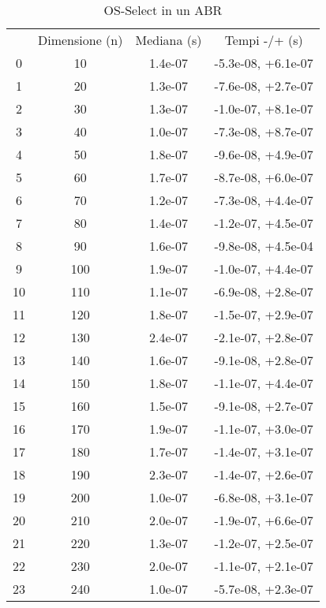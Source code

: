 \begin{table}
\centering
\caption{OS-Select in un ABR}
\label{OS-Select in un ABR}
\begin{adjustbox}{width=1\textwidth/2}
\begin{tabular}{|c|c|c|c|}
\hline
 & Dimensione (n) & Mediana (s) & Tempi -/+ (s) \\
0 & 10 & 1.4e-07 & -5.3e-08, +6.1e-07 \\
\cline{1-4}
1 & 20 & 1.3e-07 & -7.6e-08, +2.7e-07 \\
\cline{1-4}
2 & 30 & 1.3e-07 & -1.0e-07, +8.1e-07 \\
\cline{1-4}
3 & 40 & 1.0e-07 & -7.3e-08, +8.7e-07 \\
\cline{1-4}
4 & 50 & 1.8e-07 & -9.6e-08, +4.9e-07 \\
\cline{1-4}
5 & 60 & 1.7e-07 & -8.7e-08, +6.0e-07 \\
\cline{1-4}
6 & 70 & 1.2e-07 & -7.3e-08, +4.4e-07 \\
\cline{1-4}
7 & 80 & 1.4e-07 & -1.2e-07, +4.5e-07 \\
\cline{1-4}
8 & 90 & 1.6e-07 & -9.8e-08, +4.5e-04 \\
\cline{1-4}
9 & 100 & 1.9e-07 & -1.0e-07, +4.4e-07 \\
\cline{1-4}
10 & 110 & 1.1e-07 & -6.9e-08, +2.8e-07 \\
\cline{1-4}
11 & 120 & 1.8e-07 & -1.5e-07, +2.9e-07 \\
\cline{1-4}
12 & 130 & 2.4e-07 & -2.1e-07, +2.8e-07 \\
\cline{1-4}
13 & 140 & 1.6e-07 & -9.1e-08, +2.8e-07 \\
\cline{1-4}
14 & 150 & 1.8e-07 & -1.1e-07, +4.4e-07 \\
\cline{1-4}
15 & 160 & 1.5e-07 & -9.1e-08, +2.7e-07 \\
\cline{1-4}
16 & 170 & 1.9e-07 & -1.1e-07, +3.0e-07 \\
\cline{1-4}
17 & 180 & 1.7e-07 & -1.4e-07, +3.1e-07 \\
\cline{1-4}
18 & 190 & 2.3e-07 & -1.4e-07, +2.6e-07 \\
\cline{1-4}
19 & 200 & 1.0e-07 & -6.8e-08, +3.1e-07 \\
\cline{1-4}
20 & 210 & 2.0e-07 & -1.9e-07, +6.6e-07 \\
\cline{1-4}
21 & 220 & 1.3e-07 & -1.2e-07, +2.5e-07 \\
\cline{1-4}
22 & 230 & 2.0e-07 & -1.1e-07, +2.1e-07 \\
\cline{1-4}
23 & 240 & 1.0e-07 & -5.7e-08, +2.3e-07 \\

\end{tabular}
\end{adjustbox}
\end{table}
